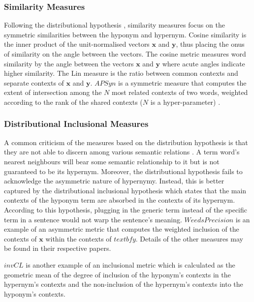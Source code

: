 \subsubsection{Similarity Measures}
Following the distributional hypothesis \citep{harris1954distributional}, similarity measures focus on the symmetric similarities between the hyponym and hypernym.  Cosine similarity is the inner product of the unit-normalised vectors $\textbf{x}$ and $\textbf{y}$, thus placing the onus of similarity on the angle between the vectors.   The cosine metric measures word similarity by the angle between the vectors $\textbf{x}$ and $\textbf{y}$ where acute angles indicate higher similarity.  The Lin measure is the ratio between common contexts and separate contexts of $\textbf{x}$ and $\textbf{y}$.  $APSyn$ is a symmetric measure that computes the extent of intersection among the $N$ most related contexts of two words, weighted according to the rank of the shared contexts ($N$ is a hyper-parameter) \citep{santus2016unsupervised}.

\subsubsection{Distributional Inclusional Measures}
A common criticism of the measures based on the distribution hypothesis is that they are not able to discern among various semantic relations \citep{roller2014inclusive}.  A term word’s nearest neighbours will bear some semantic relationship to it but is not guaranteed to be its hypernym. Moreover, the distributional hypothesis fails to acknowledge the asymmetric nature of hypernymy.  Instead, this is better captured by the distributional inclusional hypothesis \citep{geffet2005distributional} which states that the main contexts of the hyponym term are absorbed in the contexts of its hypernym.  According to this hypothesis, plugging in the generic term instead of the specific term in a sentence would not warp the sentence’s meaning.  $Weeds Precision$ \citep{weeds2003general} is an example of an asymmetric metric that computes the weighted inclusion of the contexts of $\textbf{x}$ within the contexts of $textbf{y}$.  Details of the other measures may be found in their respective papers.

$invCL$ \citep{lenci2012identifying} is another example of an inclusional metric which is calculated as the geometric mean of the degree of inclusion of the hyponym’s contexts in the hypernym’s contexts  and the non-inclusion of the hypernym’s contexts into the hyponym’s contexts.


